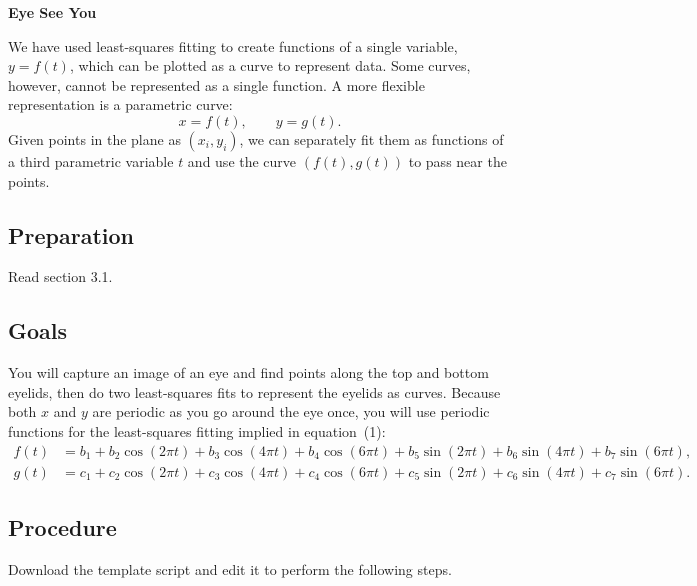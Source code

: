 \documentclass[11pt,twoside]{article}
\begin{document}
\begin{center}
  \bf Eye See You
\end{center}

We have used least-squares fitting to create functions of a single variable, $y=f(t)$, which can be plotted as a curve to represent data. Some curves, however, cannot be represented as a single function. A more flexible representation is a parametric curve: 
\begin{equation}
  \label{eq:1}
  x = f(t), \qquad y = g(t).
\end{equation}
Given points in the plane as $(x_i,y_i)$, we can separately fit them as functions of a third parametric variable $t$ and use the curve $(f(t),g(t))$ to pass near the points. 

\subsection*{Preparation}

Read section 3.1. 

\subsection*{Goals}

You will capture an image of an eye and find points along the top and bottom eyelids, then do two least-squares fits to represent the eyelids as curves. Because both $x$ and $y$ are periodic as you go around the eye once, you will use periodic functions for the least-squares fitting implied in equation~(1):
\begin{align}
  f(t) &= b_1 + b_2 \cos(2\pi t) + b_3 \cos(4\pi t) + b_4 \cos(6\pi t)  + b_5 \sin(2\pi t) + b_6 \sin(4\pi t) + b_7 \sin(6\pi t),\label{eq:2x} \\
  g(t) &= c_1 + c_2 \cos(2\pi t) + c_3 \cos(4\pi t) + c_4 \cos(6\pi t)  + c_5 \sin(2\pi t) + c_6 \sin(4\pi t) + c_7 \sin(6\pi t). \label{eq:2y}
\end{align}


\subsection*{Procedure}

Download the template script and edit it to perform the following steps.
\end{document}
